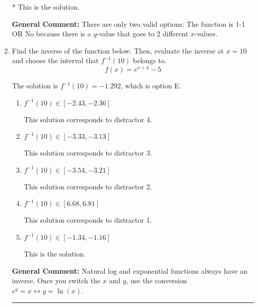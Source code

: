 \documentclass{extbook}[14pt]
\newcommand{\litem}[1]{\item #1

\rule{\textwidth}{0.4pt}}
\begin{document}
\begin{enumerate}
{\begin{enumerate}[label=\Alph*.]
* This is the solution.
\end{enumerate}

\textbf{General Comment:} There are only two valid options: The function is 1-1 OR No because there is a $y$-value that goes to 2 different $x$-values.
}
\litem{
Find the inverse of the function below. Then, evaluate the inverse at $x = 10$ and choose the interval that $f^{-1}(10)$ belongs to.
\[ f(x) = e^{x+4}-5 \]

The solution is \( f^{-1}(10) = -1.292 \), which is option E.\begin{enumerate}[label=\Alph*.]
\item \( f^{-1}(10) \in [-2.43, -2.36] \)

 This solution corresponds to distractor 4.
\item \( f^{-1}(10) \in [-3.33, -3.13] \)

 This solution corresponds to distractor 3.
\item \( f^{-1}(10) \in [-3.54, -3.21] \)

 This solution corresponds to distractor 2.
\item \( f^{-1}(10) \in [6.68, 6.81] \)

 This solution corresponds to distractor 1.
\item \( f^{-1}(10) \in [-1.34, -1.16] \)

 This is the solution.
\end{enumerate}

\textbf{General Comment:} Natural log and exponential functions always have an inverse. Once you switch the $x$ and $y$, use the conversion $ e^y = x \leftrightarrow y=\ln(x)$.
}
\end{enumerate}
\end{document}
